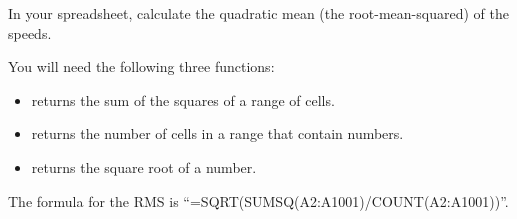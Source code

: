 \begin{Exercise}[title={RMS}, label=rms_spreadsheet]

  In your spreadsheet, calculate the quadratic mean (the root-mean-squared) of the speeds.

  You will need the following three functions:
  \begin{itemize}
  \item {} returns the sum of the squares of a range of cells.
  \item {} returns the number of cells in a range that contain numbers.
  \item {} returns the square root of a number.
  \end{itemize}


\end{Exercise}
\begin{Answer}[ref=rms_spreadsheet]

The formula for the RMS is ``=SQRT(SUMSQ(A2:A1001)/COUNT(A2:A1001))''.

\end{Answer}
